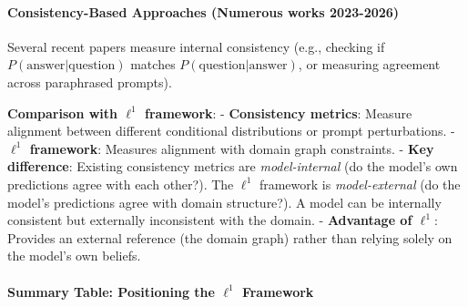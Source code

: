 \documentclass[
]{article}
\begin{document}
\paragraph{Consistency-Based Approaches (Numerous works
2023-2026)}\label{consistency-based-approaches-numerous-works-2023-2026}

Several recent papers measure internal consistency (e.g., checking if
\(P(\text{answer}|\text{question})\) matches
\(P(\text{question}|\text{answer})\), or measuring agreement across
paraphrased prompts).

\textbf{Comparison with \(\ell^1\) framework}: - \textbf{Consistency
metrics}: Measure alignment between different conditional distributions
or prompt perturbations. - \textbf{\(\ell^1\) framework}: Measures
alignment with domain graph constraints. - \textbf{Key difference}:
Existing consistency metrics are \emph{model-internal} (do the model's
own predictions agree with each other?). The \(\ell^1\) framework is
\emph{model-external} (do the model's predictions agree with domain
structure?). A model can be internally consistent but externally
inconsistent with the domain. - \textbf{Advantage of \(\ell^1\)}:
Provides an external reference (the domain graph) rather than relying
solely on the model's own beliefs.

\paragraph{\texorpdfstring{Summary Table: Positioning the \(\ell^1\)
Framework}{Summary Table: Positioning the \textbackslash ell\^{}1 Framework}}\label{summary-table-positioning-the-ell1-framework}
\end{document}
